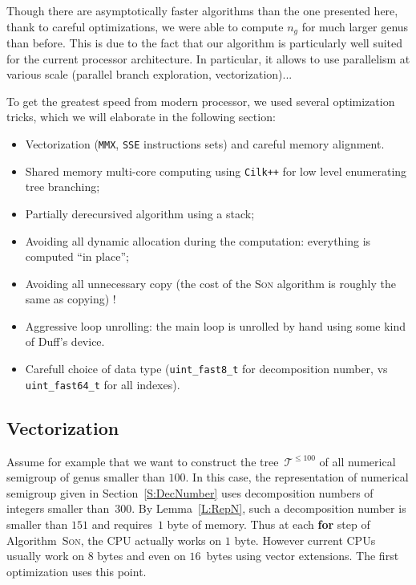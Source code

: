 \documentclass[reqno,11pt]{amsart}
\theoremstyle{plain}
\theoremstyle{definition}
\newcommand{\CilkP}{\texttt{Cilk++}\xspace}
\renewcommand{\leq}{\leqslant}
\newcommand{\MMX}{\texttt{MMX}\xspace}
\newcommand{\SSE}{\texttt{SSE}\xspace}
\begin{document}
\label{S:Opti}

Though there are asymptotically faster algorithms than the one presented here,
thank to careful optimizations, we were able to compute $n_g$ for much larger
genus than before. This is due to the fact that our algorithm is particularly
well suited for the current processor architecture. In particular, it allows
to use parallelism at various scale (parallel branch exploration,
vectorization)...

To get the greatest speed from modern processor, we used several optimization
tricks, which we will elaborate in the following section:


\begin{itemize}
\item Vectorization (\MMX, \SSE instructions sets) and careful memory alignment. 
\item Shared memory multi-core computing using \CilkP for low level
  enumerating tree branching;
\item Partially derecursived algorithm using a stack;
\item Avoiding all dynamic allocation during the computation: everything is
  computed ``in place'';
\item Avoiding all unnecessary copy (the cost of the \textsc{Son} algorithm is
  roughly the same as copying) !
\item Aggressive loop unrolling: the main loop is unrolled by hand using some
  kind of Duff's device.
\item Carefull choice of data type (\verb|uint_fast8_t| for decomposition
  number, vs \verb|uint_fast64_t| for all indexes).
\end{itemize}

\subsection{Vectorization}

Assume for example that we want to construct the tree~$\mathcal{T}^{\leq 100}$
of all numerical semigroup of genus smaller than $100$.  In this case, the
representation of numerical semigroup given in Section~\ref{S:DecNumber} uses
decomposition numbers of integers smaller than~$300$.  By Lemma~\ref{L:RepN},
such a decomposition number is smaller than $151$ and requires~$1$ byte of
memory.  Thus at each \textbf{for} step of Algorithm~\textsc{Son}, the CPU
actually works on $1$ byte. However current CPUs usually work on $8$ bytes and
even on $16$~bytes using vector extensions. 
The first optimization uses this point. 
\end{document}
